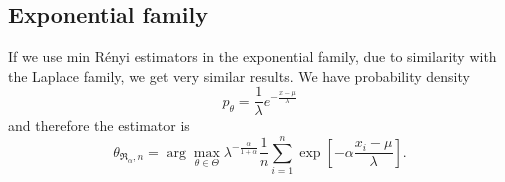 {%

\subsection*{Exponential family}
If we use min R\'{e}nyi estimators in the exponential family, due to similarity with the Laplace family, we get very similar results. We have probability density 
\begin{equation}
	p_\theta = \frac{1}{\lambda} e^{-\frac{x-\mu}{\lambda}}
\end{equation}
and therefore the estimator is 
\begin{equation}
	\theta_{\mathfrak{R}_\alpha,n} = \arg \max_{\theta \in \Theta} \lambda^{-\frac{\alpha}{1+\alpha}} \frac{1}{n}\sum_{i=1}^n \exp \left[-\alpha\frac{x_i-\mu}{\lambda} \right].
\end{equation}

}
